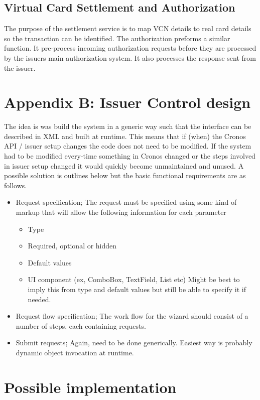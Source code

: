 \documentclass[a4paper, 11pt, titlepage]{article}
\begin{document}
\subsection{Virtual Card Settlement and Authorization} 
The purpose of the settlement service is to map VCN details to real card details so the transaction can be identified.
The authorization preforms a similar function. It pre-process incoming authorization requests before they are processed by the issuers main authorization system. It also processes the response sent from the issuer.
 
 
\cite{Orbiscom_Arch} 

\section{Appendix B: Issuer Control design}
The idea is was build the system in a generic way such that the interface can be described in XML and built at runtime. This means that if (when) the Cronos API / issuer setup changes the code does not need to be modified. If the system had to be modified every-time something in Cronos changed or the steps involved in issuer setup changed it would quickly become unmaintained and unused.  A possible solution is outlines below but the basic functional requirements are as follows.
\begin{itemize}
\item Request specification; The request must be specified using some kind of markup that will allow the following information for each parameter \label{section:required metadata}
	\begin{itemize}
	\item Type
	\item Required, optional or hidden
	\item Default values
	\item UI component (ex, ComboBox, TextField, List etc) Might be best to imply this from type and default values but still be able to specify it if needed.
	\end{itemize}
\item Request flow specification; The work flow for the wizard should consist of a number of steps, each containing requests.
\item Submit requests; Again, need to be done generically. Easiest way is probably dynamic object invocation at runtime.
\end{itemize}
\section{Possible implementation}
\end{document}

